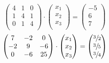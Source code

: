 \documentclass{report}
\begin{document}
        \begin{equation}
        \begin{pmatrix}
          4 & 1 & 0 \\
          1 & 4 & 1 \\
          0 & 1 & 4 \\
        \end{pmatrix}
        \cdot
        \begin{pmatrix}
          x_1 \\
          x_2 \\
          x_3 \\
        \end{pmatrix}
        =
        \begin{pmatrix}
          -5 \\
          6 \\
          7 \\
        \end{pmatrix}
        \label{syst6}
        \end{equation}
        \begin{equation}
        \begin{pmatrix}
          7 & -2 & 0 \\
          -2 & 9 & -6 \\
          0 & -6 & 25 \\
        \end{pmatrix}
        \cdot
        \begin{pmatrix}
          x_1 \\
          x_2 \\
          x_3 \\
        \end{pmatrix}
        =
        \begin{pmatrix}
          \sfrac{3}{2} \\
          \sfrac{3}{5} \\
          \sfrac{3}{4} \\
        \end{pmatrix}
        \label{syst7}
        \end{equation}
\end{document}
